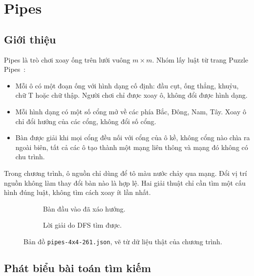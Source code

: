 \section{Pipes}
\subsection{Giới thiệu}

Pipes là trò chơi xoay ống trên lưới vuông $m\times m$. Nhóm lấy luật từ
trang Puzzle Pipes~\cite{pipes}:

\begin{itemize}
\item Mỗi ô có một đoạn ống với hình dạng cố định: đầu cụt, ống thẳng, khuỷu,
chữ T hoặc chữ thập. Người chơi chỉ được xoay ô, không đổi được hình dạng.
\item Mỗi hình dạng có một số cổng mở về các phía Bắc, Đông, Nam, Tây.
Xoay ô chỉ đổi hướng của các cổng, không đổi số cổng.
\item Bàn được giải khi mọi cổng đều nối với cổng của ô kề, không cổng nào
chìa ra ngoài biên, tất cả các ô tạo thành một mạng liên thông và mạng đó
không có chu trình.
\end{itemize}

Trong chương trình, ô nguồn chỉ dùng để tô màu nước chảy qua mạng. Đổi vị
trí nguồn không làm thay đổi bàn nào là hợp lệ. Hai giải thuật chỉ cần tìm
một cấu hình đúng luật, không tìm cách xoay ít lần nhất.

\begin{figure}[H]\centering
\begin{subfigure}{.44\textwidth}\centering
{}\caption{Bàn đầu vào đã xáo hướng.}\end{subfigure}
\hfill
\begin{subfigure}{.44\textwidth}\centering
{}\caption{Lời giải do DFS tìm được.}\end{subfigure}
\caption{Bản đồ \texttt{pipes-4x4-261.json}, vẽ từ dữ liệu thật của chương trình.}
\end{figure}

\subsection{Phát biểu bài toán tìm kiếm}

